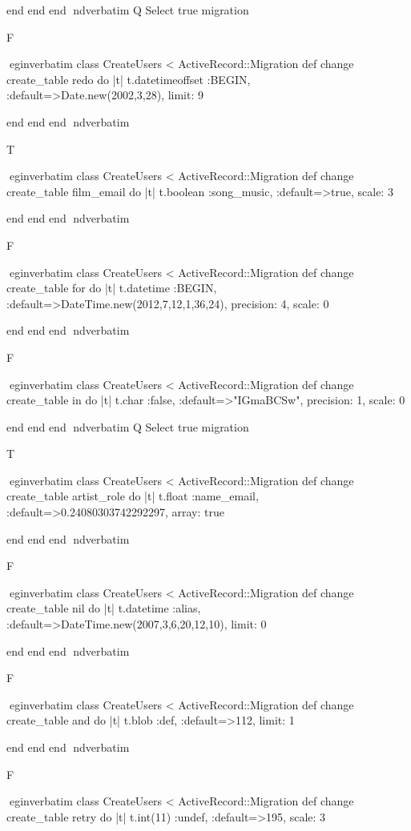     end 
  end 
end
nd{verbatim}
Q
 Select true migration

F

egin{verbatim}
 class CreateUsers < ActiveRecord::Migration 
  def change 
    create_table redo do |t| 
      t.datetimeoffset :BEGIN, :default=>Date.new(2002,3,28), limit: 9
    
    end 
  end 
end
nd{verbatim}

T

egin{verbatim}
 class CreateUsers < ActiveRecord::Migration 
  def change 
    create_table film_email do |t| 
      t.boolean :song_music, :default=>true, scale: 3
    
    end 
  end 
end
nd{verbatim}

F

egin{verbatim}
 class CreateUsers < ActiveRecord::Migration 
  def change 
    create_table for do |t| 
      t.datetime :BEGIN, :default=>DateTime.new(2012,7,12,1,36,24), precision: 4, scale: 0
    
    end 
  end 
end
nd{verbatim}

F

egin{verbatim}
 class CreateUsers < ActiveRecord::Migration 
  def change 
    create_table in do |t| 
      t.char :false, :default=>"IGmaBCSw", precision: 1, scale: 0
    
    end 
  end 
end
nd{verbatim}
Q
 Select true migration

T

egin{verbatim}
 class CreateUsers < ActiveRecord::Migration 
  def change 
    create_table artist_role do |t| 
      t.float :name_email, :default=>0.24080303742292297, array: true
    
    end 
  end 
end
nd{verbatim}

F

egin{verbatim}
 class CreateUsers < ActiveRecord::Migration 
  def change 
    create_table nil do |t| 
      t.datetime :alias, :default=>DateTime.new(2007,3,6,20,12,10), limit: 0
    
    end 
  end 
end
nd{verbatim}

F

egin{verbatim}
 class CreateUsers < ActiveRecord::Migration 
  def change 
    create_table and do |t| 
      t.blob :def, :default=>112, limit: 1
    
    end 
  end 
end
nd{verbatim}

F

egin{verbatim}
 class CreateUsers < ActiveRecord::Migration 
  def change 
    create_table retry do |t| 
      t.int(11) :undef, :default=>195, scale: 3
    
